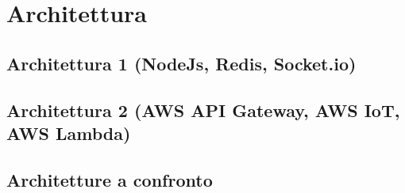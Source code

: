 
\chapter{Architettura}
\noindent\begin{minipage}{1\textwidth}%
\begin{center}


\end{center}
\end{minipage}


\section{Architettura 1 (NodeJs, Redis, Socket.io)}

\section{Architettura 2 (AWS API Gateway, AWS IoT, AWS Lambda)}

\section{Architetture a confronto}